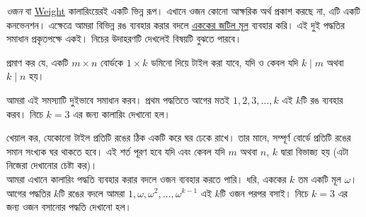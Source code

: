 \documentclass[11pt]{report}
\begin{document}
\textit{ওজন} বা \href{https://en.wikipedia.org/wiki/Weight_function#:~:text=A%20weight%20function%20is%20a,weighted%20sum%20or%20weighted%20average.}{Weight} কালারিংয়েরই একটি ভিন্ন রূপ। এখানে ওজন কোনো আক্ষরিক অর্থ প্রকাশ করছে না, এটি একটি কনভেনশন। এক্ষেত্রে আমরা বিভিন্ন রঙ ব্যবহার করার বদলে \href{https://en.wikipedia.org/wiki/Root_of_unity}{এককের জটিল মূল} ব্যবহার করি। এই দুই পদ্ধতির সমাধান প্রকৃতপক্ষে একই। নিচের উদাহরণটি দেখলেই বিষয়টি বুঝতে পারবে।\\

\begin{tcolorbox}[colframe=black!80!green,title=উদাহরণ 2.4.1]
প্রমাণ কর যে, একটি $m \times n$ বোর্ডকে $1 \times k$ ডমিনো দিয়ে টাইল করা যাবে, যদি ও কেবল যদি $k \mid m$ অথবা $k \mid n$ হয়।
\end{tcolorbox}

আমরা এই সমস্যাটি দুইভাবে সমাধান করব। প্রথম পদ্ধতিতে আগের মতই $1, 2, 3, \ldots, k$ এই $k$টি রঙ ব্যবহার করব। নিচে $k=3$ এর জন্য কালারিং দেখানো হল।

\begin{center}
\end{center}

খেয়াল কর, যেকোনো টাইল প্রতিটি রঙের ঠিক একটি করে ঘর ঢেকে রাখে। তার মানে, সম্পূর্ণ বোর্ডে প্রতিটি রঙের সমান সংখ্যক ঘর থাকতে হবে। এই শর্ত পূরণ হবে যদি এবং কেবল যদি $m$ অথবা $n$, $k$ দ্বারা বিভাজ্য হয় (এটা নিজেরা দেখানোর চেষ্টা কর)।\\

আমরা এখানে কালারিং পদ্ধতি ব্যবহার করার বদলে ওজন ব্যবহার করতে পারি। ধরি, এককের $k$ তম একটি মূল $\omega$। আগের পদ্ধতির $k$টি রঙের বদলে আমরা $1, \omega, \omega^2, \ldots, \omega^{k-1}$ এই $k$টি ওজন পরপর বসাই। নিচে $k=3$ এর জন্য ওজন বসানোর পদ্ধতি দেখানো হল।
\end{document}
